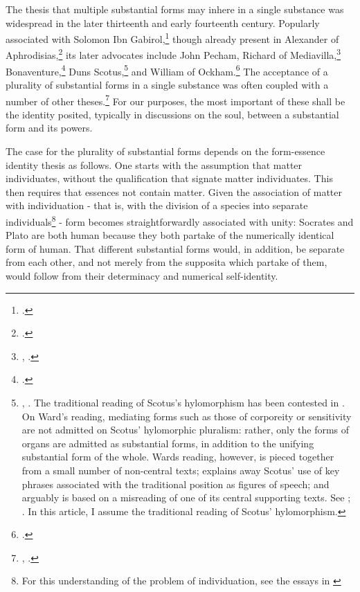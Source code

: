 \documentclass[]{article}
\begin{document}
The thesis that multiple substantial forms may inhere in a single substance was widespread in the later thirteenth and early fourteenth century. Popularly associated with Solomon Ibn Gabirol,\footcite[Bk. 2, ch. 8, 37-39; Bk. 3, ch. 3, par. 22, 81]{Avicebron} though already present in Alexander of Aphrodisias,\footcite[Bk. 1, ch. 13, 9]{AlexanderDA} its later advocates include John Pecham, Richard of Mediavilla,\footnote{\autocite[255]{Weisheipl1980}, \autocite{Zavalloni1951}.} Bonaventure,\footcite[index]{Quinn1973} Duns Scotus,\footnote{\autocite[490-497]{Gilson1952}, \autocite[187-229]{Stella1955} \autocite[47-76]{Cross1998}. The traditional reading of Scotus's hylomorphism has been contested in \autocite{Ward2012,Ward2014}. On Ward's reading, mediating forms such as those of corporeity or sensitivity are not admitted on Scotus' hylomorphic pluralism: rather, only the forms of organs are admitted as substantial forms, in addition to the unifying substantial form of the whole. Wards reading, however, is pieced together from a small number of non-central texts; explains away Scotus' use of key phrases associated with the traditional position as figures of speech; and arguably is based on a misreading of one of its central supporting texts. See \autocite[542-545; 548, fn. 58]{Ward2012}; \autocite[772-773]{Pini2016}. In this article, I assume the traditional reading of Scotus' hylomorphism.} and William of Ockham.\footcite[633-670]{Adams1987} The acceptance of a plurality of substantial forms in a single substance was often coupled with a number of other theses.\footnote{\autocite[242-243]{Weisheipl1980}, \autocite[vol. 1, p. 335]{DeWulf1926}.} For our purposes, the most important of these shall be the identity posited, typically in discussions on the soul, between a substantial form and its powers.

The case for the plurality of substantial forms depends on the form-essence identity thesis as follows. One starts with the assumption that matter individuates, without the qualification that signate matter individuates. This then requires that essences not contain matter. Given the association of matter with individuation - that is, with the division of a species into separate individuals\footnote{For this understanding of the problem of individuation, see the essays in \autocite[38-78]{KlimaHall2005}} - form becomes straightforwardly associated with unity: Socrates and Plato are both human because they both partake of the numerically identical form of human. That different substantial forms would, in addition, be separate from each other, and not merely from the supposita which partake of them, would follow from their determinacy and numerical self-identity.
	
\end{document}
